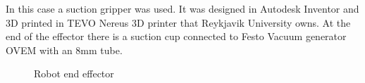 In this case a suction gripper was used. It was designed in Autodesk Inventor \cite{noauthor_inventor_nodate} and 3D printed in TEVO Nereus 3D printer that Reykjavik University owns. At the end of the effector there is a suction cup connected to Festo Vacuum generator OVEM with an 8mm tube.
\begin{figure}[ht]
    \centering
    \hfill
    \caption{Robot end effector}
    \label{figure: endeffector}
\end{figure}

